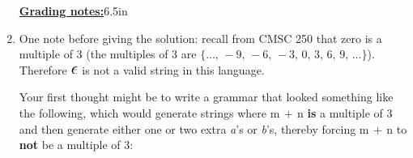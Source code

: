 \documentclass[11pt,fleqn]{article}
\begin{document}
\begin{enumerate}
\begin{info}{\textbf{\underline{Grading notes:}}}{6.5in}
          \end{info}


    \item One note before giving the solution: recall from
          CMSC 250 that zero is a multiple of 3 (the multiples of 3 are $\{
          \ldots, \, -9, \, -6, \, -3, \, 0, \, 3, \, 6, \, 9, \,
          \ldots\}$).  Therefore $\mbox{\Large \ensuremath{\epsilon}}$ is not a valid string in this
          language.


          Your first thought might be to write a grammar that looked
          something like the following, which would generate strings where
          $\mathrm{m \, + \, n}$ \textbf{is} a multiple of 3 and then
          generate either one or two extra \emph{a}'s or \emph{b}'s, thereby
          forcing $\mathrm{m \, + \, n}$ to \textbf{not} be a multiple of 3:

          \vspace{-2mm}

          \raggedcolumns

          \begin{multicols}{2}

            \begin{center}

              \begin{grammar}[1.5]
                  \\
                  \\
              \end{grammar}

            \end{center}


\end{multicols}
\end{enumerate}
\end{document}
